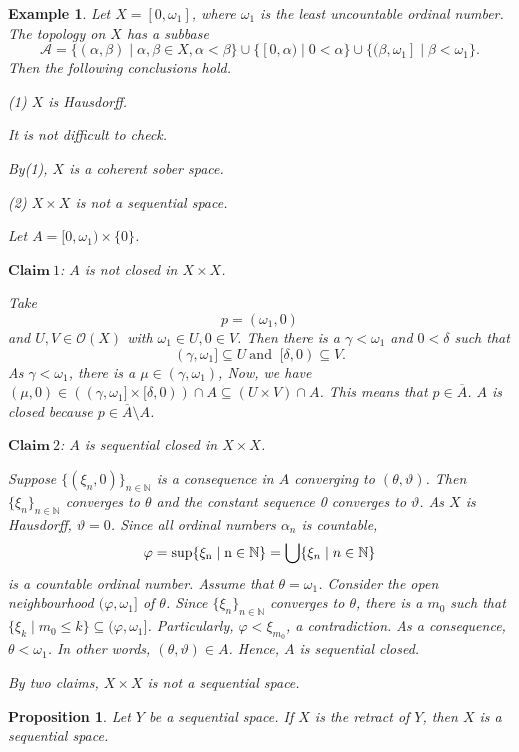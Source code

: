 \documentclass[preprint,12pt]{elsarticle}
\numberwithin{equation}{section}
\newtheorem{proposition}[theorem]{Proposition}
\newtheorem{example}[theorem]{Example}
\begin{document}
\begin{example} {\rm Let $X=[0,\omega_{1}]$, where $\omega_{1}$ is the least uncountable ordinal number. The topology on $X$ has a subbase
$$\mathcal{A}=\{(\alpha,\beta)\mid \alpha,\beta\in X, \alpha<\beta\}\cup\{[0,\alpha)\mid 0<\alpha\}\cup\{(\beta,\omega_{1}]\mid \beta<\omega_{1}\}.$$
Then the following conclusions hold.

(1) $X$ is Hausdorff.

It is not difficult to check.

By(1), $X$ is a coherent sober space.

(2) $X\times X$ is not a sequential space.

Let $A=[0,\omega_{1})\times\{0\}$.

$\mathbf{Claim}\ 1$: $A$ is not closed in $X\times X$.

Take $$p=(\omega_{1},0)$$ and $U,V\in\mathcal{O}(X)$ with $\omega_{1}\in U,0\in V$. Then there is a $\gamma<\omega_{1}$ and $0<\delta$ such that $$(\gamma,\omega_{1}]\subseteq U\ \mbox{and }\ [\delta,0)\subseteq V.$$ As $\gamma<\omega_{1}$, there is a $\mu\in(\gamma,\omega_{1})$, Now, we have $(\mu,0)\in((\gamma,\omega_{1}]\times[\delta,0))\cap A\subseteq (U\times V)\cap A$. This means that $p\in \overline{A}$. $A$ is closed because $p\in \overline{A}\setminus A$.

$\mathbf{Claim}\ 2$: $A$ is sequential closed in $X\times X$.

Suppose $\{(\xi_{n},0)\}_{n\in\mathbb{N}}$ is a consequence in $A$ converging to $(\theta,\vartheta)$. Then $\{\xi_{n}\}_{n\in\mathbb{N}}$ converges to $\theta$ and the constant sequence 0 converges to $\vartheta$. As $X$ is Hausdorff, $\vartheta=0$. Since all ordinal numbers $\alpha_{n}$ is countable, $$\varphi={\rm sup\{\xi_{n}\mid n\in\mathbb{N}\}}=\bigcup\{\xi_{n}\mid n\in\mathbb{N}\}$$ is a countable ordinal number. Assume that $\theta=\omega_{1}$. Consider the open neighbourhood $(\varphi,\omega_{1}]$ of $\theta$. Since $\{\xi_{n}\}_{n\in\mathbb{N}}$ converges to $\theta$, there is a $m_{0}$ such that $\{\xi_{k}\mid m_{0}\leq k\}\subseteq(\varphi,\omega_{1}]$. Particularly, $\varphi<\xi_{m_{0}}$, a contradiction. As a consequence, $\theta<\omega_{1}$. In other words, $(\theta,\vartheta)\in A$. Hence, $A$ is sequential closed.

By two claims, $X\times X$ is not a sequential space.}
\end{example}

\begin{proposition} {\rm Let $Y$ be a sequential space. If $X$ is the retract of $Y$, then $X$ is a sequential space.}
\end{proposition}
\end{document}

